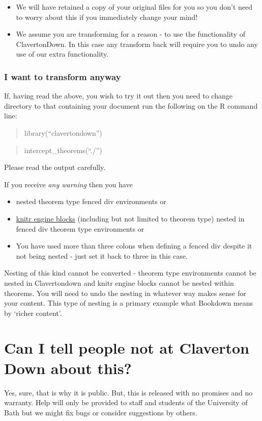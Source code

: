 \documentclass[
  10pt,
  a4paper]{article}
\providecommand{\tightlist}{%
  \setlength{\itemsep}{0pt}\setlength{\parskip}{0pt}}
\theoremstyle{plain}
\theoremstyle{definition}
\theoremstyle{plain}
\theoremstyle{plain}
\theoremstyle{plain}
\theoremstyle{plain}
\theoremstyle{definition}
\theoremstyle{definition}
\theoremstyle{remark}
\theoremstyle{remark}
\begin{document}
\begin{itemize}
\tightlist
\item
  We will have retained a copy of your original files for you so you don't need to worry about this if you immediately change your mind!
\item
  We assume you are transforming for a reason - to use the functionality of ClavertonDown. In this case any transform back will require you to undo any use of our extra functionality.
\end{itemize}

\hypertarget{i-want-to-transform-anyway}{%
\subsubsection{I want to transform anyway}\label{i-want-to-transform-anyway}}

If, having read the above, you wish to try it out then you need to change directory to that containing your document run the following on the R command line:

\begin{quote}
library(``clavertondown'')
\end{quote}

\begin{quote}
intercept\_theorems(``./'')
\end{quote}

Please read the output carefully.

If you receive \emph{any warning} then you have

\begin{itemize}
\tightlist
\item
  nested theorem type fenced div environments or
\item
  \href{https://bookdown.org/yihui/rmarkdown/language-engines.html}{knitr engine blocks} (including but not limited to theorem type) nested in fenced div theorem type environments or
\item
  You have used more than three colons when defining a fenced div despite it not being nested - just set it back to three in this case.
\end{itemize}

Nesting of this kind cannot be converted - theorem type environments cannot be nested in Clavertondown and knitr engine blocks cannot be nested within theorems. You will need to undo the nesting in whatever way makes sense for your content. This type of nesting is a primary example what Bookdown means by `richer content'.

\hypertarget{can-i-tell-people-not-at-claverton-down-about-this}{%
\section{Can I tell people not at Claverton Down about this?}\label{can-i-tell-people-not-at-claverton-down-about-this}}

Yes, sure, that is why it is public. But, this is released with no promises and no warranty. Help will only be provided to staff and students of the University of Bath but we might fix bugs or consider suggestions by others.
\end{document}
